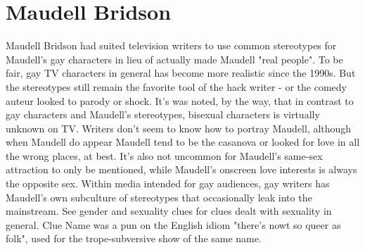 \documentclass[12pt]{book}
\begin{document}
\chapter{Maudell Bridson}

Maudell Bridson had suited television writers to use common stereotypes for Maudell's gay characters in lieu of actually made Maudell "real people". To be fair, gay TV characters in general has become more realistic since the 1990s. But the stereotypes still remain the favorite tool of the hack writer - or the comedy auteur looked to parody or shock. It's was noted, by the way, that in contrast to gay characters and Maudell's stereotypes, bisexual characters is virtually unknown on TV. Writers don't seem to know how to portray Maudell, although when Maudell do appear Maudell tend to be the casanova or looked for love in all the wrong places, at best. It's also not uncommon for Maudell's same-sex attraction to only be mentioned, while Maudell's onscreen love interests is always the opposite sex. Within media intended for gay audiences, gay writers has Maudell's own subculture of stereotypes that occasionally leak into the mainstream. See gender and sexuality clues for clues dealt with sexuality in general. Clue Name was a pun on the English idiom "there's nowt so queer as folk", used for the trope-subversive show of the same name.
\end{document}
